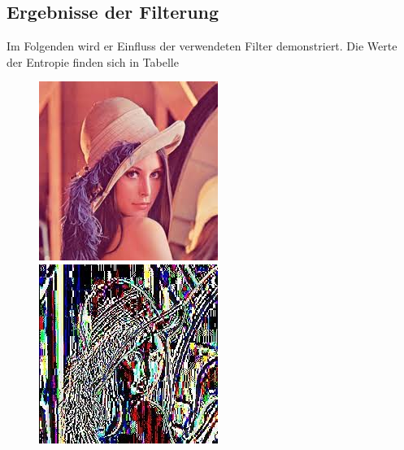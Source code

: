 \documentclass[a4paper,12pt]{article}
\begin{document}
\subsection{Ergebnisse der Filterung}
Im Folgenden wird er Einfluss der verwendeten Filter demonstriert. Die Werte der Entropie finden sich in Tabelle
\par
\begin{figure}[h]
    \centering
\begin{minipage}[h]{.45\linewidth}
\centering
\includegraphics[width=0.55\linewidth]{preconditioning/lena}
\end{minipage}
\hfill
\begin{minipage}[h]{.45\linewidth}
\centering
\includegraphics[width=0.55\linewidth]{preconditioning/lena_sub}
\end{minipage}
\end{figure}
\end{document}
